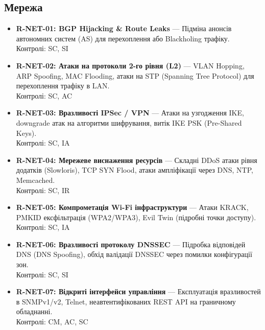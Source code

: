 \documentclass{article}
\begin{document}
\subsection{Мережа}
\begin{itemize}
\item \textbf{R-NET-01: BGP Hijacking \& Route Leaks} — Підміна анонсів автономних систем (AS) для перехоплення або Blackholing трафіку.
\\ Контролі: SC, SI
\item \textbf{R-NET-02: Атаки на протоколи 2-го рівня (L2)} — VLAN Hopping, ARP Spoofing, MAC Flooding, атаки на STP (Spanning Tree Protocol) для перехоплення трафіку в LAN.
\\ Контролі: SC, AC
\item \textbf{R-NET-03: Вразливості IPSec / VPN} — Атаки на узгодження IKE, downgrade атак на алгоритми шифрування, витік IKE PSK (Pre-Shared Keys).
\\ Контролі: SC, IA
\item \textbf{R-NET-04: Мережеве виснаження ресурсів} — Складні DDoS атаки рівня додатків (Slowloris), TCP SYN Flood, атаки ампліфікації через DNS, NTP, Memcached.
\\ Контролі: SC, IR
\item \textbf{R-NET-05: Компрометація Wi-Fi інфраструктури} — Атаки KRACK, PMKID ексфільтрація (WPA2/WPA3), Evil Twin (підробні точки доступу).
\\ Контролі: SC, IA
\item \textbf{R-NET-06: Вразливості протоколу DNSSEC} — Підробка відповідей DNS (DNS Spoofing), обхід валідації DNSSEC через помилки конфігурації зон.
\\ Контролі: SC, SI
\item \textbf{R-NET-07: Відкриті інтерфейси управління} — Експлуатація вразливостей в SNMPv1/v2, Telnet, неавтентифікованих REST API на граничному обладнанні.
\\ Контролі: CM, AC, SC\end{itemize}
\end{document}

